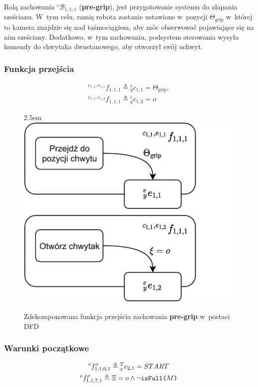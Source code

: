 Rolą zachowania ${}^{c}\mathcal{B}_{1,1,1}$ (\textbf{pre-grip}), jest przygotowanie systemu do złapania sześcianu. W~tym celu, ramię robota zostanie ustawione w~pozycji $\Theta_{\mathrm{grip}}$ w~której to kamera znajdzie się nad taśmociągiem, aby móc obserwować pojawiające się na nim sześciany. Dodatkowo, w~tym zachowaniu, podsystem sterowania wysyła komendy do chwytaka dwustanowego, aby otworzył swój uchwyt.

\subsubsection{Funkcja przejścia}
\begin{equation}
    \begin{gathered}
        {}^{c_{1,1}, e_{1,1}}f_{1,1,1} \triangleq {}^{e}_{y}c_{1,1} = \Theta_{\mathrm{grip}},
        \\
        {}^{c_{1,1}, e_{1,2}}f_{1,1,1} \triangleq {}^{e}_{y}c_{1,2} = o
    \end{gathered}
\end{equation}
    
\begin{figure}[ht]
    \leftskip2.5em
    \includegraphics[width=\columnwidth]{figures/ISR-cs-fp-pre-grip.pdf}
    \caption{Zdekomponowana funkcja przejścia zachowania \textbf{pre-grip} w~postaci DFD}
    \label{fig:cs-fp-pre-grip}
\end{figure}

\subsubsection{Warunki początkowe}
\begin{equation}
    \begin{gathered}
        {}^{c}f^{\sigma}_{1,1,0,1} \triangleq {}^{T}_{x}c_{2,1} = START\\
        {}^{c}f^{\sigma}_{1,1,7,1} \triangleq \Xi = o \land \neg \text{\texttt{isFull($M$)}}
    \end{gathered}
\end{equation}


